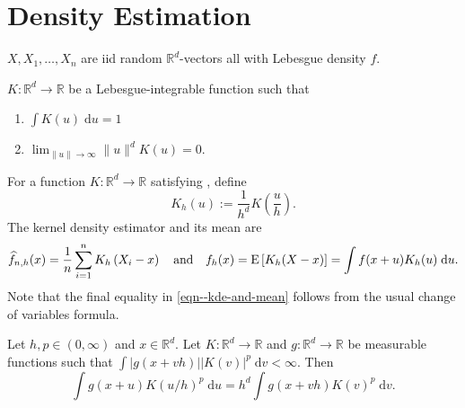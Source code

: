 
\section{Density Estimation}

\begin{assumption}
\label{asm--kde-dgp}
\(X, X_{1}, \dots, X_{n}\) are iid random \(\mathbb{R}^{d}\)-vectors all with
Lebesgue density \(f\).
\end{assumption}

\begin{assumption}
\label{asm--kernel}
\(K : \mathbb{R}^{d} \to \mathbb{R}\) be a Lebesgue-integrable function such
that
\begin{enumerate}[label=(\roman*)]
  \item
    \label{asm--kernel-unit-integral}
    \(\int K (u) \; \mathrm{d} u = 1\)
  \item \label{asm--kernel-thin-tails}
    \(\lim_{\|u\| \to \infty} \|u\|^{d} K (u) = 0\).
\end{enumerate}
\end{assumption}

For a function \(K : \mathbb{R}^{d} \to \mathbb{R}\) satisfying
, define
\begin{equation}
  K_{h} (u) := \frac{1}{h^{d}} K \left( \frac{u}{h} \right).
  \label{eqn--kernel-Kh}
\end{equation}
The kernel density estimator and its mean are
\begin{equation}
  \widehat{f}_{n, h} (x) = \frac{1}{n} \sum_{i = 1}^{n} K_{h} \left( X_{i} - x
  \right) \quad \text{and} \quad
  f_{h} (x) = \mathrm{E} \left[ K_{h} (X - x) \right] = \int f (x + u) K_{h} (u) \;
  \mathrm{d} u.
  \label{eqn--kde-and-mean}
\end{equation}
Note that the final equality in \eqref{eqn--kde-and-mean} follows from the usual
change of variables formula.

\begin{lemma}
\label{lem--kernel-polynomial-mean}
Let \(h, p \in (0, \infty)\) and \(x \in \mathbb{R}^{d}\).
Let \(K : \mathbb{R}^{d} \to \mathbb{R}\) and \(g : \mathbb{R}^{d} \to
\mathbb{R}\) be measurable functions such that
\(\int |g (x + v h)| |K (v)|^{p} \; \mathrm{d} v < \infty\).
Then
\begin{equation}
  \int g (x + u) K (u / h)^{p} \; \mathrm{d} u = h^{d} \int g (x + v h) K
  (v)^{p} \; \mathrm{d} v.
\end{equation}
\end{lemma}

